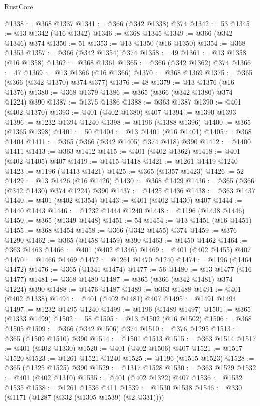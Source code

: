\begin{lexlean}{RustCore}
\begin{coremodule}
@1338 := @368 @1337
@1341 := @366 (@342 @1338) @374
@1342 := 53
@1345 := @13 @1342 (@16 @1342)
@1346 := @368 @1345
@1349 := @366 (@342 @1346) @374
@1350 := 51
@1353 := @13 @1350 (@16 @1350)
@1354 := @368 @1353
@1357 := @366 (@342 @1354) @374
@1358 := 49
@1361 := @13 @1358 (@16 @1358)
@1362 := @368 @1361
@1365 := @366 (@342 @1362) @374
@1366 := 47
@1369 := @13 @1366 (@16 @1366)
@1370 := @368 @1369
@1375 := @365 (@366 (@342 @1370) @374 @377)
@1376 := 48
@1379 := @13 @1376 (@16 @1376)
@1380 := @368 @1379
@1386 := @365 (@366 (@342 @1380) @374 @1224) @390
@1387 := @1375 @1386
@1388 := @363 @1387
@1390 := @401 (@402 @1370)
@1393 := @401 (@402 @1380) @407
@1394 := @1390 @1393
@1396 := @1232 @1394 @1240
@1398 := @1196 (@1388 @1396)
@1400 := @365 (@1365 @1398)
@1401 := 50
@1404 := @13 @1401 (@16 @1401)
@1405 := @368 @1404
@1411 := @365 (@366 (@342 @1405) @374 @418) @390
@1412 := @1400 @1411
@1413 := @363 @1412
@1415 := @401 (@402 @1362)
@1418 := @401 (@402 @1405) @407
@1419 := @1415 @1418
@1421 := @1261 @1419 @1240
@1423 := @1196 (@1413 @1421)
@1425 := @365 (@1357 @1423)
@1426 := 52
@1429 := @13 @1426 (@16 @1426)
@1430 := @368 @1429
@1436 := @365 (@366 (@342 @1430) @374 @1224) @390
@1437 := @1425 @1436
@1438 := @363 @1437
@1440 := @401 (@402 @1354)
@1443 := @401 (@402 @1430) @407
@1444 := @1440 @1443
@1446 := @1232 @1444 @1240
@1448 := @1196 (@1438 @1446)
@1450 := @365 (@1349 @1448)
@1451 := 54
@1454 := @13 @1451 (@16 @1451)
@1455 := @368 @1454
@1458 := @366 (@342 @1455) @374
@1459 := @376 @1290
@1462 := @365 (@1458 @1459) @390
@1463 := @1450 @1462
@1464 := @363 @1463
@1466 := @401 (@402 @1346)
@1469 := @401 (@402 @1455) @407
@1470 := @1466 @1469
@1472 := @1261 @1470 @1240
@1474 := @1196 (@1464 @1472)
@1476 := @365 (@1341 @1474)
@1477 := 56
@1480 := @13 @1477 (@16 @1477)
@1481 := @368 @1480
@1487 := @365 (@366 (@342 @1481) @374 @1224) @390
@1488 := @1476 @1487
@1489 := @363 @1488
@1491 := @401 (@402 @1338)
@1494 := @401 (@402 @1481) @407
@1495 := @1491 @1494
@1497 := @1232 @1495 @1240
@1499 := @1196 (@1489 @1497)
@1501 := @365 (@1333 @1499)
@1502 := 58
@1505 := @13 @1502 (@16 @1502)
@1506 := @368 @1505
@1509 := @366 (@342 @1506) @374
@1510 := @376 @1295
@1513 := @365 (@1509 @1510) @390
@1514 := @1501 @1513
@1515 := @363 @1514
@1517 := @401 (@402 @1330)
@1520 := @401 (@402 @1506) @407
@1521 := @1517 @1520
@1523 := @1261 @1521 @1240
@1525 := @1196 (@1515 @1523)
@1528 := @365 (@1325 @1525) @390
@1529 := @1317 @1528
@1530 := @363 @1529
@1532 := @401 (@402 @1310)
@1535 := @401 (@402 @1322) @407
@1536 := @1532 @1535
@1538 := @1261 @1536 @411
@1539 := @1530 @1538
@1546 := @330 (@1171 (@1287 (@332 (@1305 @1539) (@2 @331))))

\end{coremodule}
\end{lexlean}
